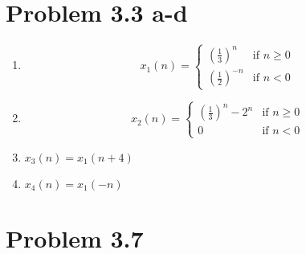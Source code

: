 \documentclass[a4paper, 11pt]{exam}
\newcommand{\wfparen}[1]{%
\left(#1\right)
}
\begin{document}
\section{Problem 3.3 a-d}
\begin{enumerate}
\item
\[
x_1(n) = 
\begin{cases}
\wfparen{\frac{1}{3}}^{n} & \text{if } n \geq 0\\
\wfparen{\frac{1}{2}}^{-n} & \text{if } n < 0 
\end{cases}
\]
\item
\[
x_2(n) = 
\begin{cases}
\wfparen{\frac{1}{3}}^{n} - 2^{n} & \text{if } n \geq 0\\
0 & \text{if } n < 0 
\end{cases}
\]
\item $x_3(n) = x_1(n+4)$
\item $x_4(n) = x_1(-n)$
\end{enumerate}
\section{Problem 3.7}
\end{document}
